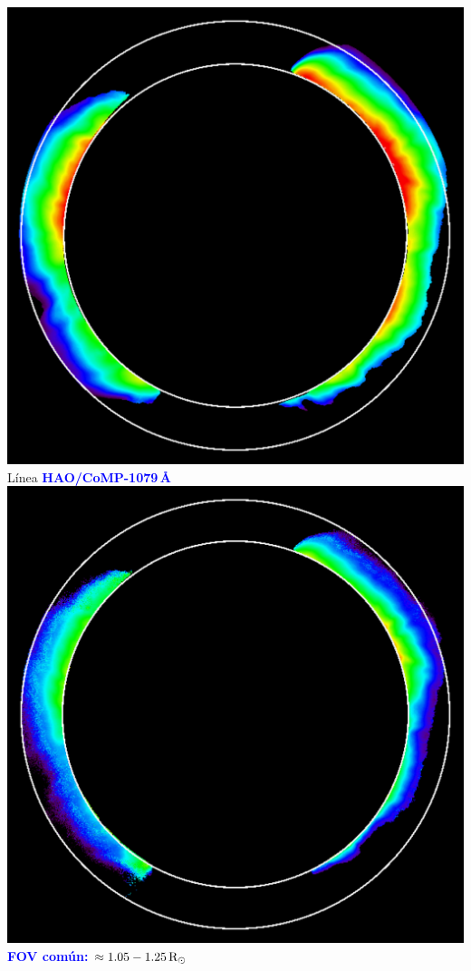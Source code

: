 \documentclass[a1,portrait,final]{baposter_old}
\def\azul#1{\textcolor{blue}{\bf\sf #1}}
\newcommand{\mrsun}{\rm{R}_\odot}
\begin{document}
\begin{poster}
{{\begin{center}
\includegraphics[width=0.9\columnwidth]{20171203_214113_comp_1074_dynamics_avg_total_intensity_t018-Dt8_images.pdf}\\
Línea \azul{HAO/CoMP-1079\,\AA}\\
\includegraphics[width=0.9\columnwidth]{20171203_202649_comp_1079_dynamics_avg_total_intensity_t018-Dt8.pdf}
\vskip 0.1cm
\azul{FOV común: $\approx 1.05-1.25\,\mrsun$}
\end{center}
}
}


\end{poster}
\end{document}
